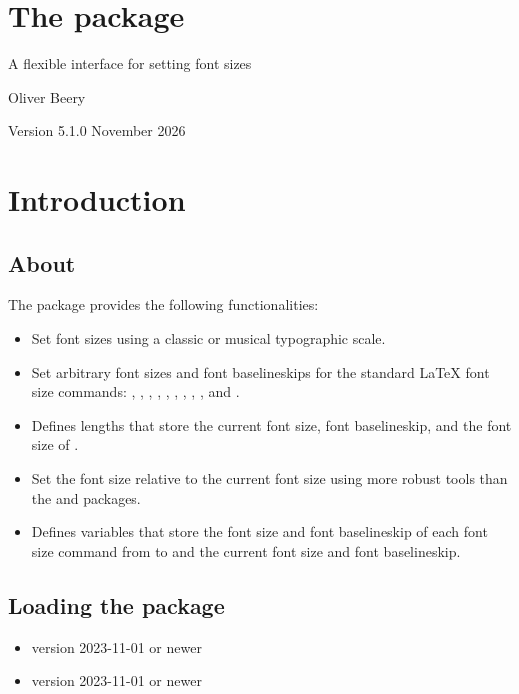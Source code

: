 \documentclass{beerydoc}
\begin{document}
\section*{The  package}

A flexible interface for setting font sizes

Oliver Beery

Version 5.1.0 November 2026

\tableofcontents
\pagebreak


\section{Introduction}
\label{sec:intro}

\subsection{About}
\label{subsec:about}

\listheading
  {The  package provides the following functionalities:}
\begin{itemize}
  \item Set font sizes using a classic or musical typographic scale.
  \item
  Set arbitrary font sizes and font baselineskips for the standard \LaTeX{}
  font size commands: , , ,
  , , , , , ,
  and .
  \item
  Defines lengths that store the current font size, font baselineskip, and the
  font size of .
  \item
  Set the font size relative to the current font size using more robust tools
  than the  and  packages.
  \item
  Defines  variables that store the font size and font baselineskip
  of each font size command from  to  and the current font
  size and font baselineskip.
\end{itemize}

\subsection{Loading the package}
\label{subsec:load}

\begin{itemize}
  \item \LaTeXe{} version 2023-11-01 or newer
  \item {} version 2023-11-01 or newer
\end{itemize}
\end{document}
